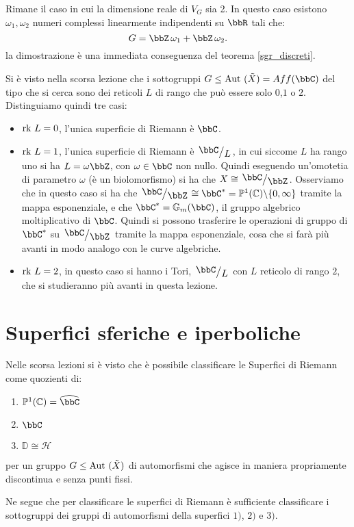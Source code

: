 Rimane il caso in cui la dimensione reale di $V_G$ sia 2. In questo caso esistono $\omega_1,\omega_2$ numeri complessi linearmente indipendenti su $\bbR$ tali che:
$$
G=\bbZ\, \omega_1+\bbZ\, \omega_2.
$$
la dimostrazione è una immediata conseguenza del teorema \ref{sgr_discreti}.


Si è visto nella scorsa lezione che i sottogruppi $G\le\Aut(\tilde{X})=Aff(\bbC)$ del tipo che si cerca sono dei reticoli $L$ di rango che può essere solo $0$,$1$ o $2$. Distinguiamo quindi tre casi:
\begin{itemize}
\item $\mbox{rk } L=0$, l'unica superficie di Riemann è $\bbC$.
\item $\mbox{rk } L=1$, l'unica superficie di Riemann è $\quotient{\bbC}{L}$, in cui siccome $L$ ha rango uno si ha $L=\omega \bbZ$, con $\omega\in\bbC$ non nullo. Quindi eseguendo un'omotetia di parametro $\omega$ (è un biolomorfismo) si ha che $X\cong \quotient{\bbC}{\bbZ}$.
Osserviamo che in questo caso si ha che $\quotient{\bbC}{\bbZ}\cong \bbC^{*}=\mathbb{P}^1(\mathbb{C})\minus\{0,\infty\}$ tramite la mappa esponenziale, e che $\bbC^{*}=\mathbb{G}_m(\bbC)$, il gruppo algebrico moltiplicativo di $\bbC$. Quindi si possono trasferire le operazioni di gruppo di $\bbC^{*}$ su $\quotient{\bbC}{\bbZ}$ tramite la mappa esponenziale, cosa che si farà più avanti in modo analogo con le curve algebriche.
\item $\mbox{rk } L=2$, in questo caso si hanno i Tori, $\quotient{\bbC}{L}$ con $L$ reticolo di rango $2$, che si studieranno più avanti in questa lezione.
\end{itemize}

\section{Superfici sferiche e iperboliche}


Nelle scorsa lezioni si è visto che è possibile classificare le Superfici di Riemann come quozienti di:
\begin{enumerate}
\item $\mathbb{P}^1(\mathbb{C})=\hat{\bbC}$
\item $\bbC$
\item $\mathbb{D} \cong \mathcal{H}$
\end{enumerate}
per un gruppo $G\le\text{Aut }(\tilde{X})$ di automorfismi che agisce in maniera propriamente discontinua e senza punti fissi.

Ne segue che per classificare le superfici di Riemann è sufficiente classificare i sottogruppi dei gruppi di automorfismi della superfici $1)$, $2)$ e $3)$.

